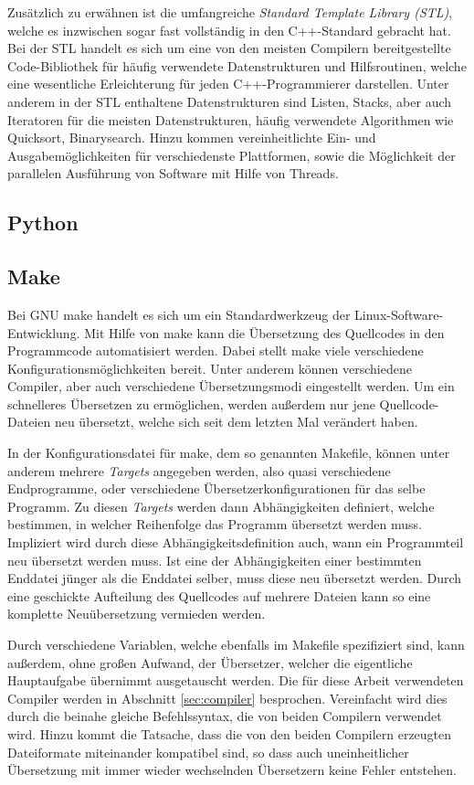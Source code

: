 Zusätzlich zu erwähnen ist die umfangreiche \textit{Standard Template Library (STL)}, welche es inzwischen sogar fast vollständig in den 
C++-Standard gebracht hat. Bei der STL handelt es sich um eine von den meisten Compilern bereitgestellte Code-Bibliothek für häufig 
verwendete Datenstrukturen und Hilfsroutinen, welche eine wesentliche Erleichterung für jeden C++-Programmierer darstellen. Unter anderem
in der STL enthaltene Datenstrukturen sind Listen, Stacks, aber auch Iteratoren für die meisten Datenstrukturen, häufig verwendete Algorithmen
wie Quicksort, Binarysearch. Hinzu kommen vereinheitlichte Ein- und Ausgabemöglichkeiten für verschiedenste Plattformen, sowie die 
Möglichkeit der parallelen Ausführung von Software mit Hilfe von Threads.

\subsection{Python}

\subsection{Make}
Bei GNU make handelt es sich um ein Standardwerkzeug der Linux-Software-Entwicklung. Mit Hilfe von make kann die Übersetzung des Quellcodes in den Programmcode automatisiert werden. 
Dabei stellt make viele verschiedene Konfigurationsmöglichkeiten bereit. Unter anderem können verschiedene Compiler, aber auch verschiedene Übersetzungsmodi eingestellt werden.
Um ein schnelleres Übersetzen zu ermöglichen, werden außerdem nur jene Quellcode-Dateien neu übersetzt, welche sich seit dem letzten Mal verändert haben. 

In der Konfigurationsdatei für make, dem so genannten Makefile, können unter anderem mehrere \textit{Targets} angegeben werden, also quasi verschiedene Endprogramme, oder verschiedene
Übersetzerkonfigurationen für das selbe Programm. Zu diesen \textit{Targets} werden dann Ab\-hängig\-keiten definiert, welche bestimmen, in welcher Reihenfolge das Programm übersetzt werden 
muss. Impliziert wird durch diese Abhängigkeitsdefinition auch, wann ein Programmteil neu übersetzt werden muss. Ist eine der Abhängigkeiten einer bestimmten Enddatei jünger als die 
Enddatei selber, muss diese neu übersetzt werden. Durch eine geschickte Aufteilung des Quellcodes auf mehrere Dateien kann so eine komplette Neuübersetzung vermieden werden. 

Durch verschiedene Variablen, welche ebenfalls im Makefile spezifiziert sind, kann außerdem, ohne großen Aufwand, der Übersetzer, welcher die eigentliche Hauptaufgabe übernimmt ausgetauscht werden.
Die für diese Arbeit verwendeten Compiler werden in Abschnitt \ref{sec:compiler} besprochen. Vereinfacht wird dies durch die beinahe gleiche Befehlssyntax, die von beiden Compilern verwendet wird.
Hinzu kommt die Tatsache, dass die von den beiden Compilern erzeugten Dateiformate miteinander kompatibel sind, so dass auch uneinheitlicher Übersetzung mit immer wieder wechselnden Übersetzern
keine Fehler entstehen.

